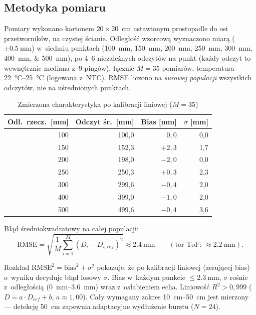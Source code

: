 \documentclass[a4paper,11pt]{article}
\begin{document}
\subsection*{Metodyka pomiaru}
Pomiary wykonano kartonem $20\times20$~\si{\centi\metre} ustawionym prostopadle
do osi przetworników, na czystej ścianie. Odległość wzorcową wyznaczono miarą
($\pm\SI{0,5}{\milli\metre}$) w~siedmiu punktach (\SIlist{100;150;200;250;300;400;500}{\milli\metre}),
po \SIrange{4}{6}{} niezależnych odczytów na punkt (każdy odczyt to wewnętrznie
mediana z~9 pingów), łącznie $M=35$ pomiarów, temperatura
\SIrange{22}{25}{\celsius} (logowana z~NTC). RMSE liczono na \emph{surowej
populacji} wszystkich odczytów, nie na uśrednionych punktach.

\begin{table}[H]
	\centering
	\caption{Zmierzona charakterystyka po kalibracji liniowej ($M=35$)}
	\label{tab:wyniki}
	\begin{tabular}{rrrr}
		\toprule
		\textbf{Odl.\ rzecz.\ [mm]} & \textbf{Odczyt śr.\ [mm]} & \textbf{Bias [mm]} & \textbf{$\sigma$ [mm]} \\
		\midrule
		100 & 100{,}0 & $0{,}0$  & 0{,}0 \\
		150 & 152{,}3 & $+2{,}3$ & 1{,}7 \\
		200 & 198{,}0 & $-2{,}0$ & 0{,}0 \\
		250 & 250{,}3 & $+0{,}3$ & 2{,}3 \\
		300 & 299{,}6 & $-0{,}4$ & 2{,}0 \\
		400 & 399{,}0 & $-1{,}0$ & 2{,}0 \\
		500 & 499{,}6 & $-0{,}4$ & 3{,}6 \\
		\bottomrule
	\end{tabular}
\end{table}

Błąd średniokwadratowy na całej populacji:
\begin{equation}
	\text{RMSE} = \sqrt{\frac{1}{M}\sum_{i=1}^{M} (D_i - D_{i,ref})^2}
	\approx \SI{2,4}{\milli\metre}
	\qquad (\text{tor ToF: } \approx\SI{2,2}{\milli\metre}).
\end{equation}

Rozkład $\text{RMSE}^2=\text{bias}^2+\sigma^2$ pokazuje, że po kalibracji
liniowej (zerującej bias) o~wyniku decyduje błąd losowy $\sigma$. Bias w~każdym
punkcie $\leq\SI{2,3}{\milli\metre}$, $\sigma$ rośnie z~odległością
(\SIrange{0}{3,6}{\milli\metre}) wraz z~osłabieniem echa. Liniowość
$R^2>0{,}999$ ($D=a\cdot D_{ref}+b$, $a\approx1{,}00$). Cały wymagany zakres
\SIrange{10}{50}{\centi\metre} jest mierzony --- detekcję \SI{50}{\centi\metre}
zapewnia adaptacyjne wydłużenie burstu ($N=24$).
\end{document}
